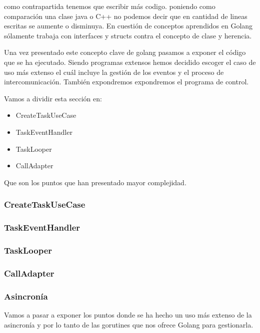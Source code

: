 como contrapartida tenemos que escribir más codigo. poniendo como comparación una clase java o C++ no podemos decir que en cantidad de lineas escritas se aumente o disminuya. En cuestión de conceptos aprendidos en Golang sólamente trabaja con interfaces y structs contra el concepto de clase y herencia.

Una vez presentado este concepto clave de golang pasamos a exponer el código que se ha ejecutado. Siendo programas extensos hemos decidido escoger el caso de uso más extenso el cuál incluye la gestión de los eventos y el proceso de intercomunicación. También expondremos expondremos el programa de control.

Vamos a dividir esta sección en:
\begin{itemize}
    \item CreateTaskUseCase
    \item TaskEventHandler
    \item TaskLooper
    \item CallAdapter
\end{itemize}

Que son los puntos que han presentado mayor complejidad.

\subsubsection{CreateTaskUseCase}
    
\subsubsection{TaskEventHandler}
%    
\subsubsection{TaskLooper}
%    
\subsubsection{CallAdapter}
%    
\subsubsection{Asincronía}\label{subsec:asincronia}
    Vamos a pasar a exponer los puntos donde se ha hecho un uso más extenso de la asincronía y por lo tanto de las gorutines que nos ofrece Golang para gestionarla.
